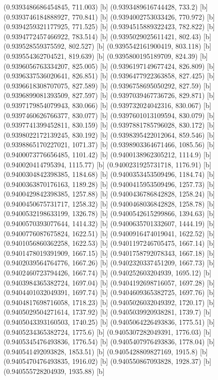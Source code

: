 {{{(0.9393486686454845, 711.003) [b] 
(0.9393489616744428, 733.2) [b] 
(0.9393746184888927, 770.841) [b] 
(0.9394002753033426, 770.972) [b] 
(0.9394259321177925, 771.525) [b] 
(0.9394515889322423, 782.822) [b] 
(0.9394772457466922, 783.514) [b] 
(0.9395029025611421, 802.43) [b] 
(0.939528559375592, 802.527) [b] 
(0.9395542161900419, 803.118) [b] 
(0.939554362704521, 819.639) [b] 
(0.9395800195189709, 824.39) [b] 
(0.9396056763334207, 825.005) [b] 
(0.9396197149677424, 826.809) [b] 
(0.9396337536020641, 826.851) [b] 
(0.9396477922363858, 827.425) [b] 
(0.9396618308707075, 827.589) [b] 
(0.9396758695050292, 827.59) [b] 
(0.9396899081393509, 827.597) [b] 
(0.9397039467736726, 829.871) [b] 
(0.9397179854079943, 830.066) [b] 
(0.939732024042316, 830.067) [b] 
(0.9397460626766377, 830.077) [b] 
(0.9397601013109594, 830.079) [b] 
(0.9397741399452811, 830.159) [b] 
(0.9397881785796028, 830.172) [b] 
(0.9398022172139245, 830.192) [b] 
(0.9398395422012064, 859.546) [b] 
(0.9398865170227021, 1071.37) [b] 
(0.9398903364671466, 1085.56) [b] 
(0.9400073776656485, 1101.42) [b] 
(0.9400138962305212, 1114.9) [b] 
(0.940020414795394, 1115.77) [b] 
(0.9400231925731718, 1176.91) [b] 
(0.9400304842398385, 1184.68) [b] 
(0.9400353453509496, 1184.74) [b] 
(0.9400363870176163, 1189.28) [b] 
(0.9400415953509496, 1257.73) [b] 
(0.9400429842398385, 1257.88) [b] 
(0.9400436786842828, 1258.24) [b] 
(0.9400450675731717, 1258.32) [b] 
(0.9400468036842828, 1258.78) [b] 
(0.9400532198633199, 1326.78) [b] 
(0.9400542615299866, 1394.63) [b] 
(0.9400570393077644, 1414.32) [b] 
(0.9400635701332607, 1444.19) [b] 
(0.9400776087675824, 1622.51) [b] 
(0.9400916474019041, 1622.52) [b] 
(0.9401056860362258, 1622.53) [b] 
(0.9401197246705475, 1667.14) [b] 
(0.9401478019391909, 1667.15) [b] 
(0.9401758792078343, 1667.18) [b] 
(0.9402039564764776, 1667.26) [b] 
(0.9402320337451209, 1667.73) [b] 
(0.9402460723794426, 1667.74) [b] 
(0.940252603204939, 1695.12) [b] 
(0.9403984365382724, 1697.04) [b] 
(0.9404192698716057, 1697.28) [b] 
(0.9404401032049391, 1697.74) [b] 
(0.9404609365382725, 1697.76) [b] 
(0.9404817698716058, 1718.23) [b] 
(0.9405026032049392, 1720.17) [b] 
(0.9405029504271614, 1737.92) [b] 
(0.9405039920938281, 1739.7) [b] 
(0.9405043393160503, 1740.25) [b] 
(0.9405064226493836, 1775.51) [b] 
(0.9405234365382724, 1775.6) [b] 
(0.9405307282049391, 1776.03) [b] 
(0.9405345476493836, 1776.54) [b] 
(0.9405407976493836, 1778.04) [b] 
(0.940541492093828, 1853.51) [b] 
(0.9405428809827169, 1915.8) [b] 
(0.9405470476493835, 1916.02) [b] 
(0.940550867093828, 1928.37) [b] 
(0.940555728204939, 1935.88) [b] 
}}}
